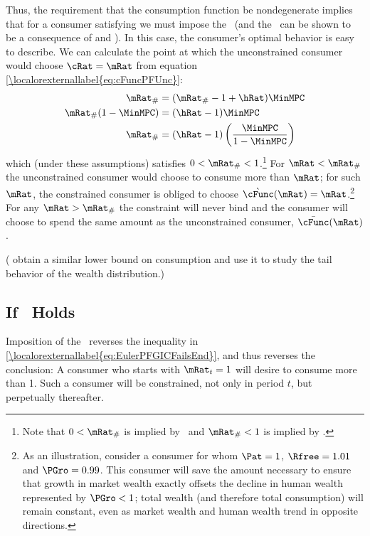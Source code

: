 \documentclass[\econtexRoot/BufferStockTheory]{subfiles}
\begin{document}
Thus, the requirement that the consumption function be nondegenerate
implies that for a consumer satisfying \cncl{\PFGIC} we must impose
the \RIC~(and the \FHWC~can be shown to be a consequence of \cncl{\PFGIC} and \RIC).  In
this case, the consumer's optimal behavior is easy to describe.  We
can calculate the point at which the unconstrained consumer would
choose $\cRat = \mRat$ from equation \eqref{\localorexternallabel{eq:cFuncPFUnc}}:
\begin{equation}\begin{gathered}\begin{aligned}
  \mRat_{\#}  & = (\mRat_{\#}-1+\hRat)\MinMPC
  \\ \mRat_{\#}(1-\MinMPC)  & = (\hRat - 1)\MinMPC
  \\ \mRat_{\#}  & = (\hRat - 1)\left(\frac{\MinMPC}{1-\MinMPC}\right)
\end{aligned}\end{gathered}\end{equation}
which (under these assumptions) satisfies $0 < \mRat_{\#} < 1$.\footnote{Note that $0 < \mRat_{\#}$ is implied by \RIC~and $ \mRat_{\#}<1$ is implied by \cncl{\PFGIC}.}  For
$\mRat < \mRat_{\#}$ the unconstrained consumer would choose to
consume more than $\mRat$; for such $\mRat$, the constrained consumer
is obliged to choose $\grave{\cFunc}(\mRat) = \mRat$.\footnote{As an
  illustration, consider a consumer for whom $\Pat = 1$, $\Rfree
  =1.01$ and $\PGro = 0.99$.  This consumer will save the amount
  necessary to ensure that growth in market wealth exactly offsets the
  decline in human wealth represented by $\PGro < 1$; total wealth
  (and therefore total consumption) will remain constant, even as
  market wealth and human wealth trend in opposite directions.}  For
any $\mRat > \mRat_{\#}$ the constraint will never bind and the
consumer will choose to spend the same amount as the unconstrained
consumer, $\bar{\cFunc}(\mRat)$.

(\cite{StachurskiToda2019JET} obtain a similar lower bound on consumption and use it to study the tail behavior of the wealth distribution.)


\subsection{If \PFGIC~Holds}

Imposition of the \PFGIC~reverses the inequality in
\eqref{\localorexternallabel{eq:EulerPFGICFailsEnd}}, and thus
reverses the conclusion: A consumer who starts with $\mRat_{t}=1$ will
desire to consume more than 1.  Such a consumer will be constrained,
not only in period $t$, but perpetually thereafter.
\end{document}
